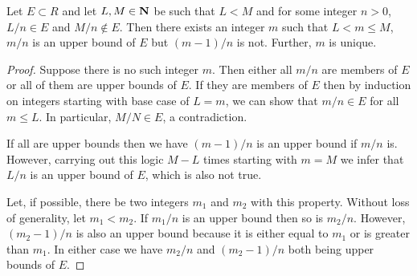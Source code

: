 \begin{lem}\label{c4s5l1}
Let $E \subset R$ and let $L, M \in \mathbf{N}$ be such that $L < M$ and for
some integer $n > 0$, $L/n \in E$ and $M/n \notin E$. Then there exists
an integer $m$ such that $L < m \le M$, $m/n$ is an upper bound of $E$
but $(m - 1)/n$ is not. Further, $m$ is unique.
\end{lem}
\begin{proof}
Suppose there is no such integer $m$. Then either all $m/n$ are members of
$E$ or all of them are upper bounds of $E$. If they are members of $E$ 
then by induction on integers starting with base case of $L = m$, we can
show that $m/n \in E$ for all $m \le L$. In particular, $M/N \in E$, a
contradiction.

If all are upper bounds then we have $(m - 1)/n$ is an upper bound if 
$m/n$ is. However, carrying out this logic $M - L$ times starting with
$m = M$ we infer that $L/n$ is an upper bound of $E$, which is also not
true.

Let, if possible, there be two integers $m_1$ and $m_2$ with this 
property. Without loss of generality, let $m_1 < m_2$. If $m_1/n$ is an 
upper bound then so is $m_2/n$. However, $(m_2 - 1)/n$ is also an upper
bound because it is either equal to $m_1$ or is greater than $m_1$. In
either case we have $m_2/n$ and $(m_2 - 1)/n$ both being upper bounds of
$E$.
\end{proof}

